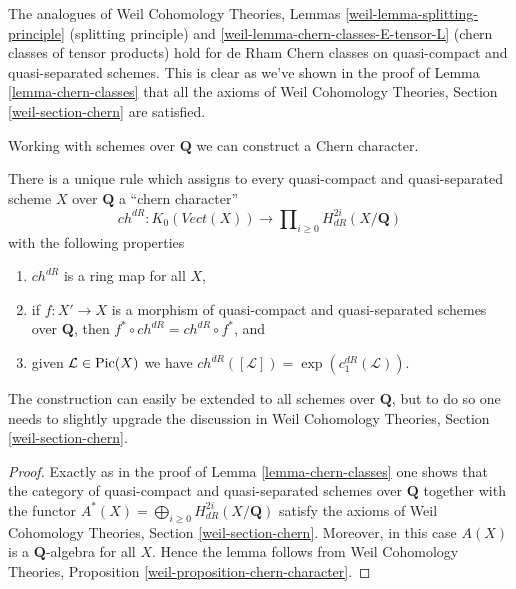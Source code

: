 \begin{remark}
\label{remark-splitting-principle}
The analogues of Weil Cohomology Theories, Lemmas
\ref{weil-lemma-splitting-principle} (splitting principle) and
\ref{weil-lemma-chern-classes-E-tensor-L} (chern classes of tensor products)
hold for de Rham Chern classes on quasi-compact and quasi-separated schemes.
This is clear as we've shown in the proof of
Lemma \ref{lemma-chern-classes}
that all the axioms of Weil Cohomology Theories, Section
\ref{weil-section-chern} are satisfied.
\end{remark}

\noindent
Working with schemes over $\mathbf{Q}$ we can construct a Chern character.

\begin{lemma}
\label{lemma-chern-character}
There is a unique rule which assigns to every quasi-compact and quasi-separated
scheme $X$ over $\mathbf{Q}$ a ``chern character''
$$
ch^{dR} : K_0(\textit{Vect}(X)) \longrightarrow
\prod\nolimits_{i \geq 0} H_{dR}^{2i}(X/\mathbf{Q})
$$
with the following properties
\begin{enumerate}
\item $ch^{dR}$ is a ring map for all $X$,
\item if $f : X' \to X$ is a morphism of quasi-compact and quasi-separated
schemes over $\mathbf{Q}$, then $f^* \circ ch^{dR} =  ch^{dR} \circ f^*$, and
\item given $\mathcal{L} \in \mathop{\mathrm{Pic}}\nolimits(X)$
we have $ch^{dR}([\mathcal{L}]) = \exp(c_1^{dR}(\mathcal{L}))$.
\end{enumerate}
\end{lemma}

\noindent
The construction can easily be extended to all schemes over $\mathbf{Q}$,
but to do so one needs to slightly upgrade the discussion in
Weil Cohomology Theories, Section \ref{weil-section-chern}.

\begin{proof}
Exactly as in the proof of Lemma \ref{lemma-chern-classes}
one shows that the category of quasi-compact and quasi-separated
schemes over $\mathbf{Q}$ together with the functor
$A^*(X) = \bigoplus_{i \geq 0} H_{dR}^{2i}(X/\mathbf{Q})$
satisfy the axioms of
Weil Cohomology Theories, Section \ref{weil-section-chern}.
Moreover, in this case $A(X)$ is a $\mathbf{Q}$-algebra for
all $X$. Hence the lemma follows from
Weil Cohomology Theories, Proposition
\ref{weil-proposition-chern-character}.
\end{proof}







